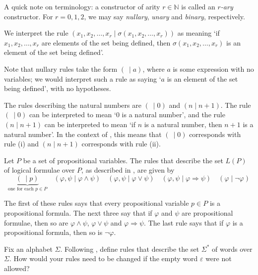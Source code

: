 A quick note on terminology: a constructor of arity $r \in \mathbb{N}$ is called an \textit{$r$-ary} constructor. For $r=0,1,2$, we may say \textit{nullary}, \textit{unary} and \textit{binary}, respectively.

We interpret the rule $(x_1,x_2,\dots,x_r \mid \sigma(x_1,x_2,\dots,x_r))$ as meaning `if $x_1,x_2,\dots,x_r$ are elements of the set being defined, then $\sigma(x_1,x_2,\dots,x_r)$ is an element of the set being defined'.

Note that nullary rules take the form $(~ \mid a)$, where $a$ is some expression with no variables; we would interpret such a rule as saying `$a$ is an element of the set being defined', with no hypotheses.

\begin{example}
The rules describing the natural numbers are $(~ \mid 0)$ and $(n \mid n+1)$. The rule $(~ \mid 0)$ can be interpreted to mean `$0$ is a natural number', and the rule $(n \mid n+1)$ can be interpreted to mean `if $n$ is a natural number, then $n+1$ is a natural number'. In the context of , this means that $(~ \mid 0)$ corresponds with rule (i) and $(n \mid n+1)$ corresponds with rule (ii).
\end{example}

\begin{example}
\label{exRulesForInductiveDefinitionOfPropositionalFormulae}
Let $P$ be a set of propositional variables. The rules that describe the set $L(P)$ of logical formulae over $P$, as described in , are given by
\[ \underbrace{(~ \mid p)}_{\text{one for each } p \in P} \quad (\varphi,\psi \mid \varphi \wedge \psi) \quad (\varphi,\psi \mid \varphi \vee \psi) \quad (\varphi,\psi \mid \varphi \Rightarrow \psi) \quad (\varphi \mid \neg \varphi) \]

The first of these rules says that every propositional variable $p \in P$ is a propositional formula. The next three say that if $\varphi$ and $\psi$ are propositional formulae, then so are $\varphi \wedge \psi$, $\varphi \vee \psi$ and $\varphi \Rightarrow \psi$. The last rule says that if $\varphi$ is a propositional formula, then so is $\neg \varphi$.
\end{example}

\begin{exercise}
\label{exRulesForInductiveDefinitionOfWords}
Fix an alphabet $\Sigma$. Following , define rules that describe the set $\Sigma^*$ of words over $\Sigma$. How would your rules need to be changed if the empty word $\varepsilon$ were not allowed?
\end{exercise}

